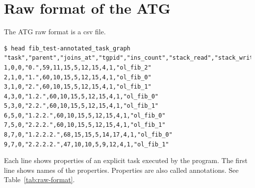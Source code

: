 \documentclass[11pt,a4paper,notitlepage]{article}
\begin{document}
\section{Raw format of the ATG}
The ATG raw format is a csv file.

\begin{lstlisting}[style=BashInputStyle]
$ head fib_test-annotated_task_graph
"task","parent","joins_at","tgpid","ins_count","stack_read","stack_write","mem_fp","ccr","clr","mem_read","mem_write","name"
1,0,0,"0.",59,11,15,5,12,15,4,1,"ol_fib_2"
2,1,0,"1.",60,10,15,5,12,15,4,1,"ol_fib_0"
3,1,0,"2.",60,10,15,5,12,15,4,1,"ol_fib_1"
4,3,0,"1.2.",60,10,15,5,12,15,4,1,"ol_fib_0"
5,3,0,"2.2.",60,10,15,5,12,15,4,1,"ol_fib_1"
6,5,0,"1.2.2.",60,10,15,5,12,15,4,1,"ol_fib_0"
7,5,0,"2.2.2.",60,10,15,5,12,15,4,1,"ol_fib_1"
8,7,0,"1.2.2.2.",68,15,15,5,14,17,4,1,"ol_fib_0"
9,7,0,"2.2.2.2.",47,10,10,5,9,12,4,1,"ol_fib_1"
\end{lstlisting}

Each line shows properties of an explicit task executed by the program.
The first line shows names of the properties. 
Properties are also called annotations.
See Table~\ref{tab:raw-format}.
\end{document}
